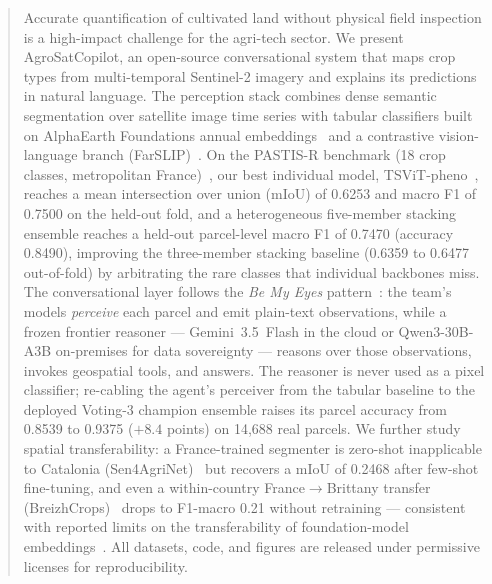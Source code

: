 \begin{abstract}
Accurate quantification of cultivated land without physical field
inspection is a high-impact challenge for the agri-tech sector.
We present AgroSatCopilot, an open-source conversational system that
maps crop types from multi-temporal Sentinel-2 imagery and explains its
predictions in natural language. The perception stack combines dense
semantic segmentation over satellite image time series with tabular
classifiers built on AlphaEarth Foundations annual
embeddings~\cite{brown2025alphaearth} and a contrastive
vision-language branch (FarSLIP)~\cite{li2025farslip}. On the PASTIS-R
benchmark (18 crop classes, metropolitan
France)~\cite{garnot2021pastis}, our best individual model,
TSViT-pheno~\cite{tarasiou2023tsvit}, reaches a mean intersection over
union (mIoU) of 0.6253 and macro F1 of 0.7500 on the held-out fold,
and a heterogeneous five-member stacking ensemble reaches a held-out
parcel-level macro F1 of 0.7470 (accuracy 0.8490), improving the
three-member stacking baseline (0.6359 to 0.6477 out-of-fold) by
arbitrating the rare classes that individual backbones miss.
The conversational layer follows the
\emph{Be My Eyes} pattern~\cite{huang2025bemyeyes}: the team's models
\emph{perceive} each parcel and emit plain-text observations, while a
frozen frontier reasoner --- Gemini~3.5~Flash in the cloud or
Qwen3-30B-A3B on-premises for data sovereignty --- reasons over those
observations, invokes geospatial tools, and answers. The reasoner is
never used as a pixel classifier; re-cabling the agent's perceiver from
the tabular baseline to the deployed Voting-3 champion ensemble raises its
parcel accuracy from 0.8539 to 0.9375 ($+8.4$ points) on 14{,}688 real
parcels. We further study spatial
transferability: a France-trained segmenter is zero-shot inapplicable
to Catalonia (Sen4AgriNet)~\cite{sykas2022sen4agrinet} but recovers a
mIoU of 0.2468 after few-shot fine-tuning, and even a within-country
France$\rightarrow$Brittany transfer (BreizhCrops)~\cite{russwurm2020breizhcrops}
drops to F1-macro 0.21 without retraining --- consistent with reported
limits on the transferability of foundation-model
embeddings~\cite{harvesting2026alphaearth}. All datasets, code, and
figures are released under permissive licenses for reproducibility.
\end{abstract}

